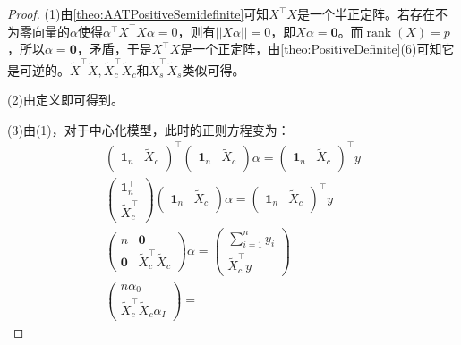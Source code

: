 \begin{proof}
	(1)由\cref{theo:AATPositiveSemidefinite}可知$X^{\top}X$是一个半正定阵。若存在不为零向量的$\alpha$使得$\alpha^{\top}X^{\top}X\alpha=0$，则有$||X\alpha||=0$，即$X\alpha=\mathbf{0}$。而$\operatorname{rank}(X)=p$，所以$\alpha=\mathbf{0}$，矛盾，于是$X^{\top}X$是一个正定阵，由\cref{theo:PositiveDefinite}(6)可知它是可逆的。$\tilde{X}^{\top}\tilde{X},\tilde{X}_c^{\top}\tilde{X}_c$和$\tilde{X}_s^{\top}\tilde{X}_s$类似可得。\par
	(2)由定义即可得到。\par
	(3)由(1)，对于中心化模型，此时的正则方程变为：
	\begin{gather*}
		\begin{pmatrix}
			\mathbf{1}_n & \tilde{X}_c \\
		\end{pmatrix}^{\top}
		\begin{pmatrix}
			\mathbf{1}_n & \tilde{X}_c \\
		\end{pmatrix}\alpha=
		\begin{pmatrix}
			\mathbf{1}_n & \tilde{X}_c \\
		\end{pmatrix}^{\top}y \\
		\begin{pmatrix}
			\mathbf{1}_n^{\top} \\
			\tilde{X}_c^{\top}
		\end{pmatrix}
		\begin{pmatrix}
			\mathbf{1}_n & \tilde{X}_c \\
		\end{pmatrix}\alpha=
		\begin{pmatrix}
			\mathbf{1}_n & \tilde{X}_c \\
		\end{pmatrix}^{\top}y \\
		\begin{pmatrix}
			n & \mathbf{0} \\
			\mathbf{0} & \tilde{X}_c^{\top}\tilde{X}_c
		\end{pmatrix}\alpha=
		\begin{pmatrix}
			\sum\limits_{i=1}^{n}y_i \\
			\tilde{X}_c^{\top}y
		\end{pmatrix} \\
		\begin{pmatrix}
			n\alpha_0  \\
			\tilde{X}_c^{\top}\tilde{X}_c\alpha_I
		\end{pmatrix}=

\end{gather*}
\end{proof}
